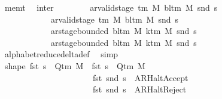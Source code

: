 \begin{isabellebody}
\ mem{\isacharunderscore}{\kern0pt}t\ \isamarkupfalse%
\ inter{\isacharcolon}{\kern0pt}\isanewline
\ \ \ \ \ \ \ \ {\isachardoublequoteopen}ar{\isacharunderscore}{\kern0pt}valid{\isacharunderscore}{\kern0pt}stage\ {\isacharparenleft}{\kern0pt}{\isasymGamma}{\isacharunderscore}{\kern0pt}tm\ M{\isacharparenright}{\kern0pt}\ {\isacharparenleft}{\kern0pt}bl{\isacharunderscore}{\kern0pt}tm\ M{\isacharparenright}{\kern0pt}\ {\isacharparenleft}{\kern0pt}snd\ s{\isacharparenright}{\kern0pt}\isanewline
\ \ \ \ \ \ \ \ \ \ \ {\isasymand}\ ar{\isacharunderscore}{\kern0pt}valid{\isacharunderscore}{\kern0pt}stage\ {\isacharparenleft}{\kern0pt}{\isasymGamma}{\isacharunderscore}{\kern0pt}tm\ M{\isacharparenright}{\kern0pt}\ {\isacharparenleft}{\kern0pt}bl{\isacharunderscore}{\kern0pt}tm\ M{\isacharparenright}{\kern0pt}\ {\isacharparenleft}{\kern0pt}snd\ s{\isacharprime}{\kern0pt}{\isacharparenright}{\kern0pt}\isanewline
\ \ \ \ \ \ \ \ \ \ \ {\isasymand}\ ar{\isacharunderscore}{\kern0pt}stage{\isacharunderscore}{\kern0pt}bounded\ {\isacharparenleft}{\kern0pt}bl{\isacharunderscore}{\kern0pt}tm\ M{\isacharparenright}{\kern0pt}\ {\isacharparenleft}{\kern0pt}k{\isacharunderscore}{\kern0pt}tm\ M{\isacharparenright}{\kern0pt}\ {\isacharparenleft}{\kern0pt}snd\ s{\isacharparenright}{\kern0pt}\isanewline
\ \ \ \ \ \ \ \ \ \ \ {\isasymand}\ ar{\isacharunderscore}{\kern0pt}stage{\isacharunderscore}{\kern0pt}bounded\ {\isacharparenleft}{\kern0pt}bl{\isacharunderscore}{\kern0pt}tm\ M{\isacharparenright}{\kern0pt}\ {\isacharparenleft}{\kern0pt}k{\isacharunderscore}{\kern0pt}tm\ M{\isacharparenright}{\kern0pt}\ {\isacharparenleft}{\kern0pt}snd\ s{\isacharprime}{\kern0pt}{\isacharparenright}{\kern0pt}{\isachardoublequoteclose}\isanewline
\ \ \ \ \ \ \ \ \isamarkupfalse%
\ alphabet{\isacharunderscore}{\kern0pt}reduce{\isacharunderscore}{\kern0pt}delta{\isacharunderscore}{\kern0pt}def\ \isamarkupfalse%
\ simp\isanewline
\ \ \ \ \ \ %
\isanewline
\ \ \ \ \ \ \isamarkupfalse%
\ shape{\isacharcolon}{\kern0pt}\ {\isachardoublequoteopen}fst\ s\ {\isasymin}\ Q{\isacharunderscore}{\kern0pt}tm\ M\ {\isasymand}\ fst\ s{\isacharprime}{\kern0pt}\ {\isasymin}\ Q{\isacharunderscore}{\kern0pt}tm\ M\isanewline
\ \ \ \ \ \ \ \ \ \ \ \ \ \ \ \ \ \ \ \ \ {\isasymand}\ fst\ {\isacharparenleft}{\kern0pt}snd\ s{\isacharparenright}{\kern0pt}\ {\isasymnoteq}\ AR{\isacharunderscore}{\kern0pt}HaltAccept\isanewline
\ \ \ \ \ \ \ \ \ \ \ \ \ \ \ \ \ \ \ \ \ {\isasymand}\ fst\ {\isacharparenleft}{\kern0pt}snd\ s{\isacharparenright}{\kern0pt}\ {\isasymnoteq}\ AR{\isacharunderscore}{\kern0pt}HaltReject{\isachardoublequoteclose}\isanewline

\end{isabellebody}
